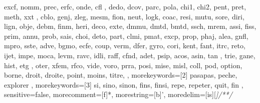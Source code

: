 {{      excf, nomm, prec, erfc, onde, cfl , dedo, dcov, parc,
      pola, chi1, chi2, pent, pret, meth, xxt , cblo, genj,
      zleg, mesm, fion, neut, logk, coac, resi, mutu, sore,
      diri, lign, obje, debm, finm, heri, deco, exte, dmmu,
      dmtd, bmtd, ssch, mrem, assi, fiss, prim, annu, prob,
      sais, choi, deto, part, clmi, pmat, excp, prop, phaj,
      alea, gnfl, mpro, sste, adve, bgmo, ecfe, coup, verm,
      dfer, gyro, cori, kent, fant, itrc, reto, ijet, impe,
      moca, levm, ravc, idli, raff, cfnd, adet, psip, acos,
      asin, tan , trie, gane, hist, etg , oter, xfem, rfco,
      vide, voro, prra, posi, mise, misl, coll, pod,  
      option, borne, droit, droite, point, moins, titre,
  },
  morekeywords=[2]{  %
    pasapas, peche, explorer
  },
  morekeywords=[3]{  %
    si, sino, sinon, fins, finsi, repe, repeter, quit, fin
  },
  sensitive=false, %
  morecomment=[f]*, %
  morestring=[b]', %
  moredelim=[is][\sffamily\slshape\color{blue}]{/*}{*/}
}

